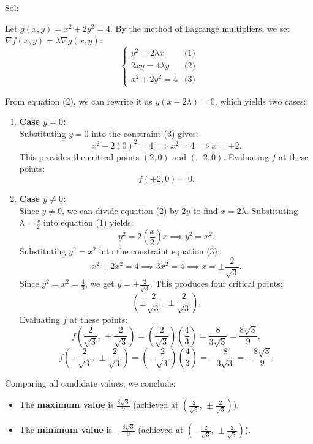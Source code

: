 \documentclass[11pt,svgnames,spanish,oneside]{amsart}
\newenvironment{mysolution}{%
  \solution\color{blue}Sol:
}{%
  \endsolution
}
\begin{document}
\begin{mysolution}
Let $g(x,y) = x^2 + 2y^2 = 4$. By the method of Lagrange multipliers, we set $\nabla f(x,y) = \lambda \nabla g(x,y)$:
\[
\begin{cases}
y^2 = 2\lambda x & \text{(1)} \\
2xy = 4\lambda y & \text{(2)} \\
x^2 + 2y^2 = 4 & \text{(3)}
\end{cases}
\]

From equation (2), we can rewrite it as $y(x - 2\lambda) = 0$, which yields two cases:

\begin{enumerate}[label=\roman*)]
    \item \textbf{Case $y = 0$:} \\
    Substituting $y = 0$ into the constraint (3) gives:
    \[
    x^2 + 2(0)^2 = 4 \implies x^2 = 4 \implies x = \pm 2.
    \]
    This provides the critical points $(2,0)$ and $(-2,0)$. Evaluating $f$ at these points:
    \[
    f(\pm 2, 0) = 0.
    \]

    \item \textbf{Case $y \neq 0$:} \\
    Since $y \neq 0$, we can divide equation (2) by $2y$ to find $x = 2\lambda$. Substituting $\lambda = \frac{x}{2}$ into equation (1) yields:
    \[
    y^2 = 2\left(\frac{x}{2}\right)x \implies y^2 = x^2.
    \]
    Substituting $y^2 = x^2$ into the constraint equation (3):
    \[
    x^2 + 2x^2 = 4 \implies 3x^2 = 4 \implies x = \pm \frac{2}{\sqrt{3}}.
    \]
    Since $y^2 = x^2 = \frac{4}{3}$, we get $y = \pm \frac{2}{\sqrt{3}}$. This produces four critical points:
    \[
    \left(\pm \frac{2}{\sqrt{3}}, \, \pm \frac{2}{\sqrt{3}}\right).
    \]
    Evaluating $f$ at these points:
    \[
    f\left(\frac{2}{\sqrt{3}}, \, \pm \frac{2}{\sqrt{3}}\right) = \left(\frac{2}{\sqrt{3}}\right)\left(\frac{4}{3}\right) = \frac{8}{3\sqrt{3}} = \frac{8\sqrt{3}}{9},
    \]
    \[
    f\left(-\frac{2}{\sqrt{3}}, \, \pm \frac{2}{\sqrt{3}}\right) = \left(-\frac{2}{\sqrt{3}}\right)\left(\frac{4}{3}\right) = -\frac{8}{3\sqrt{3}} = -\frac{8\sqrt{3}}{9}.
    \]
\end{enumerate}

Comparing all candidate values, we conclude:
\begin{itemize}
    \item The \textbf{maximum value} is $\displaystyle \frac{8\sqrt{3}}{9}$ (achieved at $\left(\frac{2}{\sqrt{3}}, \, \pm \frac{2}{\sqrt{3}}\right)$).
    \item The \textbf{minimum value} is $\displaystyle -\frac{8\sqrt{3}}{9}$ (achieved at $\left(-\frac{2}{\sqrt{3}}, \, \pm \frac{2}{\sqrt{3}}\right)$).
\end{itemize}
\end{mysolution}
\end{document}
